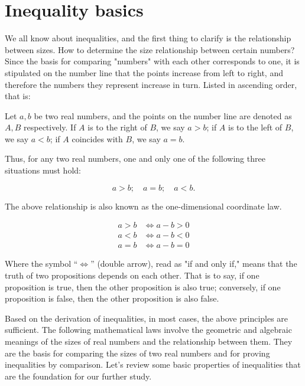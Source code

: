 \documentclass[
	12pt, %
	fleqn, %
	a4paper, %
]{LegrandOrangeBook}
\begin{document}
\section{Inequality basics}
We all know about inequalities, and the first thing to clarify is the relationship between sizes. How to determine the size relationship between certain numbers? Since the basis for comparing "numbers" with each other corresponds to one, it is stipulated on the number line that the points increase from left to right, and therefore the numbers they represent increase in turn. Listed in ascending order, that is:

Let \( a, b \) be two real numbers, and the points on the number line are denoted as \( A, B \) respectively. If \( A \) is to the right of \( B \), we say \( a > b \); if \( A \) is to the left of \( B \), we say \( a < b \); if \( A \) coincides with \( B \), we say \( a = b \).

Thus, for any two real numbers, one and only one of the following three situations must hold:

\[
a > b; \quad a = b; \quad a < b.
\]

The above relationship is also known as the one-dimensional coordinate law.

\[
\begin{aligned}
a > b &\Leftrightarrow a - b > 0 \\
a < b &\Leftrightarrow a - b < 0 \\
a = b &\Leftrightarrow a - b = 0
\end{aligned}
\]

Where the symbol “\( \Leftrightarrow \)” (double arrow), read as "if and only if," means that the truth of two propositions depends on each other. That is to say, if one proposition is true, then the other proposition is also true; conversely, if one proposition is false, then the other proposition is also false.

Based on the derivation of inequalities, in most cases, the above principles are sufficient. The following mathematical laws involve the geometric and algebraic meanings of the sizes of real numbers and the relationship between them. They are the basis for comparing the sizes of two real numbers and for proving inequalities by comparison. Let's review some basic properties of inequalities that are the foundation for our further study.
\end{document}
